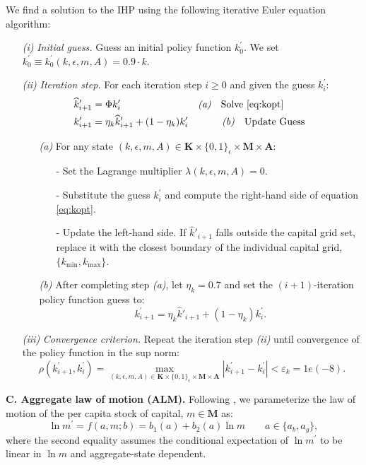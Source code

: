 \documentclass[12pt,american]{article}
\newcommand{\kprime}{k^{\prime}}
\newcommand{\kupd}{\widehat{k}'_{i+1}}
\newcommand{\kgss}{\kprime_{i}}
\newcommand{\tollk}{\varepsilon_{k}}
\newcommand{\Aset}{\mathbf{A}}
\newcommand{\kset}{\mathbf{K}}
\newcommand{\idset}{\{0,1\}_{\epsilon}}
\newcommand{\kdismomset}{\mathbf{M}}
\newcommand{\state}{k,\epsilon,m,A}
\newcommand{\stateset}{\kset \times \idset \times \kdismomset \times \Aset}
\newcommand{\mprime}{m^{\prime}}
\newcommand{\tollkcode}{1e(-8)}
\begin{document}
We find a solution to the IHP using the following iterative Euler equation algorithm:
\begin{itemize}
\item [\textit{(i)}] \textit{Initial guess.} Guess an initial policy function $\kprime_{0}$. We set $\kprime_{0}\equiv\kprime_{0}(\state)=0.9\cdot k$.
\item [\textit{(ii)}] \textit{Iteration step.} For each iteration step $i\geq 0$ and given the guess $\kgss$:
\begin{align*}
\kupd&=\Phi\kgss &\textit{(a)}\quad\text{Solve \eqref{eq:kopt}}\phantom{asfsd}\,\\
\kprime_{i+1}&=\eta_{k} \kupd + (1-\eta_{k}) \kgss  &\textit{(b)}\quad\text{Update Guess}\phantom{f}
\end{align*}
\begin{itemize}
\item [\textit{(a)}] For any state $(\state) \in \stateset$:
\begin{itemize}
\item [-] Set the Lagrange multiplier $\lambda(\state)=0$.
\item [-] Substitute the guess $\kgss$ and compute the right-hand side of equation \eqref{eq:kopt}.
\item [-] Update the left-hand side. If $\kupd$ falls outside the capital grid set, replace it with the closest boundary of the individual capital grid, $\{k_{\min},k_{\max}\}$.
\end{itemize}
\item [\textit{(b)}] After completing step \textit{(a)}, let $\eta_{k}=0.7$ and set the $(i+1)$-iteration policy function guess to:
\begin{equation}
\kprime_{i+1}=\eta_{k} \kupd + (1-\eta_{k}) \kgss.\label{eq:kupdate}
\end{equation}
\end{itemize}
\item [\textit{(iii)}] \textit{Convergence criterion.} Repeat the iteration step \textit{(ii)} until convergence of the policy function in the sup norm: 
\begin{equation}\label{eq:ktoll}
\rho\left (\kprime_{i+1},\kgss\right)=\max_{(\state) \in \stateset}|\kprime_{i+1}-\kgss|< \tollk=\tollkcode.
\end{equation}
\end{itemize}

\textbf{C. Aggregate law of motion (ALM).} Following \citet{MaliarMaliarValli2010}, we parameterize the law of motion of the per capita stock of capital, $m\in \mathbb{\kdismomset}$ as:
\begin{equation}\label{eq:mopt}
\ln \mprime=f(a,m;b)= b_1(a) + b_2(a) \ln m\qquad a\in\{a_b,a_g\},
\end{equation}
where the second equality assumes the conditional expectation of $\ln \mprime$ to be linear in $\ln m$ and aggregate-state dependent.
\end{document}
